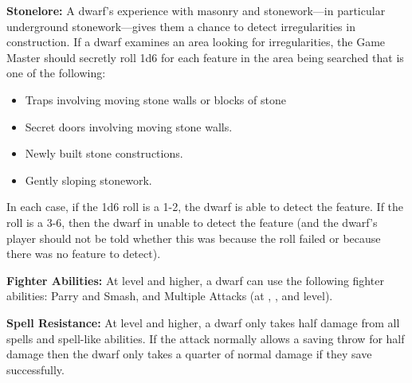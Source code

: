 \begin{multicols*}{2}
\textbf{Stonelore:}\label{sec:Stonelore} A dwarf’s experience with masonry and stonework—in particular underground stonework—gives them a chance to detect irregularities in construction. If a dwarf examines an area looking for irregularities, the Game Master should secretly roll 1d6 for each feature in the area being searched that is one of the following:

\begin{itemize}
	\item{Traps involving moving stone walls or blocks of stone}
	\item{Secret doors involving moving stone walls.}
	\item{Newly built stone constructions.}
	\item{Gently sloping stonework.}
\end{itemize}

In each case, if the 1d6 roll is a 1-2, the dwarf is able to detect the feature. If the roll is a 3-6, then the dwarf in unable to detect the feature (and the dwarf’s player should not be told whether this was because the roll failed or because there was no feature to detect).

\textbf{Fighter Abilities:} At  level and higher, a dwarf can use the following fighter abilities: Parry and Smash, and Multiple Attacks (at , , and  level).

\textbf{Spell Resistance:} At  level and higher, a dwarf only takes half damage from all spells and spell-like abilities. If the attack normally allows a saving throw for half damage then the dwarf only takes a quarter of normal damage if they save successfully.


\end{multicols*}
